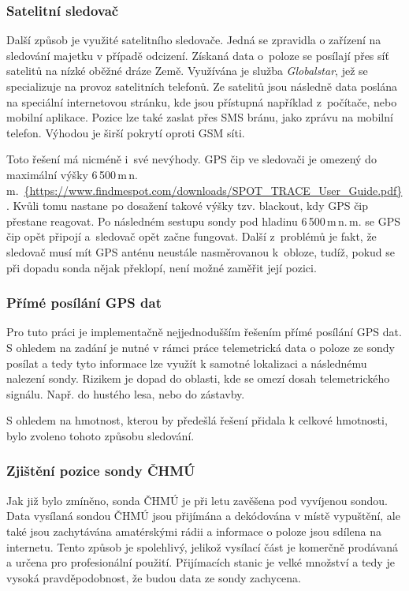 \documentclass[twoside]{ctuthesis}
\theoremstyle{plain}
\theoremstyle{definition}
\theoremstyle{note}
\begin{document}
				\subsubsection{Satelitní sledovač}
				Další způsob je využité satelitního sledovače. Jedná se zpravidla o zařízení na sledování majetku v případě odcizení. Získaná data o~poloze se posílají přes síť satelitů na nízké oběžné dráze Země. Využívána je služba \textit{Globalstar}, jež se specializuje na provoz satelitních telefonů. Ze satelitů jsou následně data poslána na speciální internetovou stránku, kde jsou přístupná například z~počítače, nebo mobilní aplikace. Pozice lze také zaslat přes SMS bránu, jako zprávu na mobilní telefon. Výhodou je širší pokrytí oproti GSM síti. 

				Toto řešení má nicméně i~své nevýhody. GPS čip ve sledovači je omezený do maximální výšky 6\,500\,m\,n.\,m.~\url{{https://www.findmespot.com/downloads/SPOT_TRACE_User_Guide.pdf}}. Kvůli tomu nastane po dosažení takové výšky tzv. blackout, kdy GPS čip přestane reagovat. Po následném sestupu sondy pod hladinu 6\,500\,m\,n.\,m. se GPS čip opět připojí a~sledovač opět začne fungovat. Další z~problémů je fakt, že sledovač musí mít GPS anténu neustále nasměrovanou k~obloze, tudíž, pokud se při dopadu sonda nějak překlopí, není možné zaměřit její pozici.

				\subsubsection{Přímé posílání GPS dat}
				Pro tuto práci je implementačně nejjednodušším řešením přímé posílání GPS dat. S ohledem na zadání je nutné v rámci práce telemetrická data o poloze ze sondy posílat a tedy tyto informace lze využít k samotné lokalizaci a následnému nalezení sondy. Rizikem je dopad do oblasti, kde se omezí dosah telemetrického signálu. Např. do hustého lesa, nebo do zástavby.

				S ohledem na hmotnost, kterou by předešlá řešení přidala k celkové hmotnosti, bylo zvoleno tohoto způsobu sledování.

				\subsubsection{Zjištění pozice sondy ČHMÚ}
				Jak již bylo zmíněno, sonda ČHMÚ je při letu zavěšena pod vyvíjenou sondou. Data vysílaná sondou ČHMÚ jsou přijímána a dekódována v místě vypuštění, ale také jsou zachytávána amatérskými rádii a informace o poloze jsou sdílena na internetu. Tento způsob je spolehlivý, jelikož vysílací část je komerčně prodávaná a určena pro profesionální použití. Přijímacích stanic je velké množství a tedy je vysoká pravděpodobnost, že budou data ze sondy zachycena. 
\end{document}
